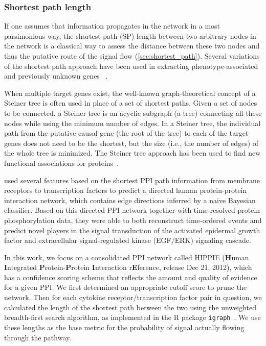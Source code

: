\subsubsection{Shortest path length}
If one assumes that information propagates in the network in 
a most parsimonious way,
the shortest path (SP) length between two arbitrary nodes in the network is a classical way to
assess the distance between these two nodes and thus the putative route of the signal flow
(\ref{sec:shortest_path}). Several variations of the 
shortest path approach have been used in extracting 
phenotype-associated and previously unknown genes~%
\citep{Zhou2002,Managbanag2008}.

When multiple target genes exist, the well-known graph-theoretical concept of a Steiner tree is often used in place of a set of shortest paths. Given a set of nodes to be connected, a Steiner tree is an acyclic subgraph (a tree) connecting all these nodes while using the minimum number of edges. In a Steiner tree, the individual path from the putative causal gene (the root of the tree) to each of the target genes does not need to be the shortest, but the size (i.e., the number of edges) of the whole tree is minimized. The Steiner tree approach has been used to find new functional associations for proteins~\citep{Huang2009,Bailly-Bechet2011}.

\cite{Vinayagam2011} used several features based on the shortest PPI path 
information from membrane receptors to transcription factors to
predict a directed human protein-protein interaction 
network, which contains edge directions
inferred by a naive Bayesian classifier.
Based on this directed PPI network together with 
time-resolved protein phosphorylation data,
they were able to both reconstruct time-ordered events and
predict novel players in the signal transduction of the activated epidermal growth factor and extracellular signal-regulated kinase (EGF/ERK) signaling cascade.

In this work, we focus on a consolidated PPI network called HIPPIE 
(\textbf{H}uman \textbf{I}ntegrated \textbf{P}rotein-\textbf{P}rotein 
\textbf{I}nteraction r\textbf{E}ference, release Dec 21, 2012), 
which has a confidence scoring 
scheme that reflects the amount and quality of evidence for a given PPI. 
We first determined an appropriate cutoff score to prune the network.
Then for each cytokine receptor/transcription factor pair in question,
we calculated the length of the shortest path between the two
using the unweighted breadth-first search algorithm,
as implemented in the R package \texttt{igraph}~\citep{Csardi2006}.
We use these lengths as the base metric for the probability 
of signal actually flowing through the pathway.

